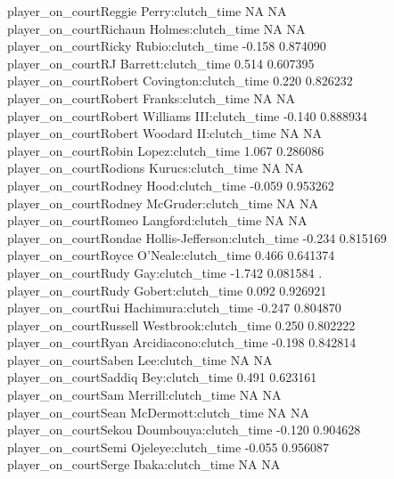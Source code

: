 \documentclass[
  landscape]{article}
\begin{document}
player\_on\_courtReggie Perry:clutch\_time NA NA\\
player\_on\_courtRichaun Holmes:clutch\_time NA NA\\
player\_on\_courtRicky Rubio:clutch\_time -0.158 0.874090\\
player\_on\_courtRJ Barrett:clutch\_time 0.514 0.607395\\
player\_on\_courtRobert Covington:clutch\_time 0.220 0.826232\\
player\_on\_courtRobert Franks:clutch\_time NA NA\\
player\_on\_courtRobert Williams III:clutch\_time -0.140 0.888934\\
player\_on\_courtRobert Woodard II:clutch\_time NA NA\\
player\_on\_courtRobin Lopez:clutch\_time 1.067 0.286086\\
player\_on\_courtRodions Kurucs:clutch\_time NA NA\\
player\_on\_courtRodney Hood:clutch\_time -0.059 0.953262\\
player\_on\_courtRodney McGruder:clutch\_time NA NA\\
player\_on\_courtRomeo Langford:clutch\_time NA NA\\
player\_on\_courtRondae Hollis-Jefferson:clutch\_time -0.234 0.815169\\
player\_on\_courtRoyce O'Neale:clutch\_time 0.466 0.641374\\
player\_on\_courtRudy Gay:clutch\_time -1.742 0.081584 .\\
player\_on\_courtRudy Gobert:clutch\_time 0.092 0.926921\\
player\_on\_courtRui Hachimura:clutch\_time -0.247 0.804870\\
player\_on\_courtRussell Westbrook:clutch\_time 0.250 0.802222\\
player\_on\_courtRyan Arcidiacono:clutch\_time -0.198 0.842814\\
player\_on\_courtSaben Lee:clutch\_time NA NA\\
player\_on\_courtSaddiq Bey:clutch\_time 0.491 0.623161\\
player\_on\_courtSam Merrill:clutch\_time NA NA\\
player\_on\_courtSean McDermott:clutch\_time NA NA\\
player\_on\_courtSekou Doumbouya:clutch\_time -0.120 0.904628\\
player\_on\_courtSemi Ojeleye:clutch\_time -0.055 0.956087\\
player\_on\_courtSerge Ibaka:clutch\_time NA NA\\
\end{document}

